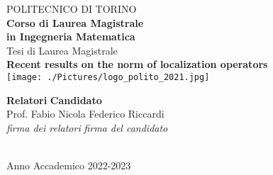 \begin{titlepage}


\begin{center}

{\huge POLITECNICO DI TORINO}\\[1.5cm]
\textbf{Corso di Laurea Magistrale\\in Ingegneria Matematica}\\[3cm]

{\Large Tesi di Laurea Magistrale}\\[0.5cm]
\textbf{\LARGE Recent results on the norm of localization operators}\\[2cm]
\texttt{[image: ./Pictures/logo\_polito\_2021.jpg]}
\vspace{4cm}


\begin{minipage}{0.85\textwidth}
\begin{flushleft}\large
\textbf{Relatori} \hfill \textbf{Candidato}\\
Prof. Fabio Nicola \hfill Federico Riccardi\\
\textit{firma dei relatori} \hfill \textit{firma del candidato}\\[0.35cm]
\fillin\ \hfill \fillin
\end{flushleft}
\end{minipage}

\vfill

Anno Accademico 2022-2023
\end{center}

\restoregeometry %

\end{titlepage}